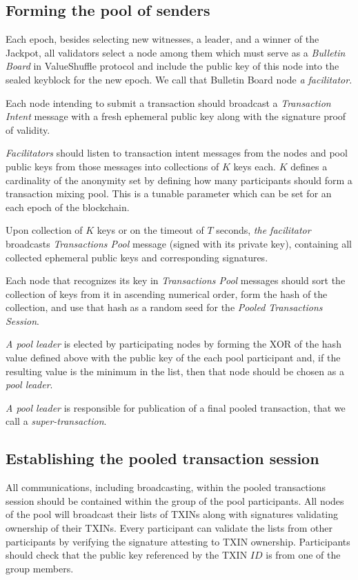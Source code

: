 \documentclass[a4paper, 10pt, conference]{ieeeconf}
\begin{document}
\subsection{Forming the pool of senders}
Each epoch, besides selecting new witnesses, a leader, and a winner of the Jackpot, all validators select a node among them which must serve as a \textit{Bulletin Board} in ValueShuffle protocol and include the public key of this node into the sealed keyblock for the new epoch. We call that Bulletin Board node \textit{a facilitator}.

Each node intending to submit a transaction should broadcast a \textit{Transaction Intent} message with a fresh ephemeral public key along with the signature proof of validity.

\textit{Facilitators} should listen to transaction intent messages from the nodes and pool public keys from those messages into collections of $K$ keys each. $K$ defines a cardinality of the anonymity set by defining how many participants should form a transaction mixing pool. This is a tunable parameter which can be set for an each epoch of the blockchain. 

Upon collection of $K$ keys or on the timeout of $T$ seconds, \textit{the facilitator} broadcasts \textit{Transactions Pool} message (signed with its private key), containing all collected ephemeral public keys and corresponding signatures.

Each node that recognizes its key in \textit{Transactions Pool} messages should sort the collection of keys from it in ascending numerical order, form the hash of the collection, and use that hash as a random seed for the \textit{Pooled Transactions Session}.

\textit{A pool leader} is elected by participating nodes by forming the XOR of the hash value defined above with the public key of the each pool participant and, if the resulting value is the minimum in the list, then that node should be chosen as a \textit{pool leader}.

\textit{A pool leader} is responsible for publication of a final pooled transaction, that we call a \textit{super-transaction}.

\subsection{Establishing the pooled transaction session}
All communications, including broadcasting, within the pooled transactions session should be contained within the group of the pool participants. All nodes of the pool will broadcast their lists of TXINs along with signatures validating ownership of their TXINs. Every participant can validate the lists from other participants by verifying the signature attesting to TXIN ownership. Participants should check that the public key referenced by the TXIN $ID$ is from one of the group members.
\end{document}
